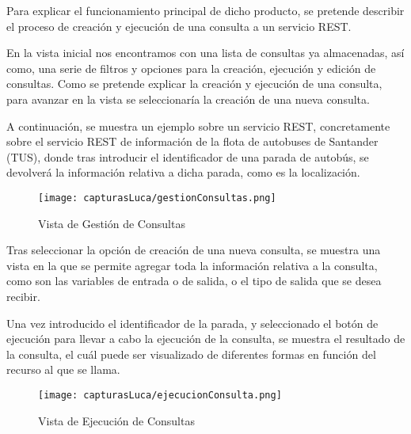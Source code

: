 \vspace{5mm}

Para explicar el funcionamiento principal de dicho producto, se pretende describir el proceso de creación y ejecución de una consulta a un servicio REST.

\vspace{5mm}

En la vista inicial nos encontramos con una lista de consultas ya almacenadas, así como, una serie de filtros y opciones para la creación, ejecución y edición de consultas. Como se pretende explicar la creación y ejecución de una consulta, para avanzar en la vista se seleccionaría la creación de una nueva consulta.


\vspace{5mm}

A continuación, se muestra un ejemplo sobre un servicio REST, concretamente sobre el servicio REST de información de la flota de autobuses de Santander (TUS), donde tras introducir el identificador de una parada de autobús, se devolverá la información relativa a dicha parada, como es la localización.


	
	\begin{figure}[H]
		\centering
 		\texttt{[image: capturasLuca/gestionConsultas.png]}
		\caption{Vista de Gestión de Consultas}\label{fig:gestionConsulta}
	\end{figure}

Tras seleccionar la opción de creación de una nueva consulta, se muestra una vista en la que se permite agregar toda la información relativa a la consulta, como son las variables de entrada o de salida, o el tipo de salida que se desea recibir.

\vspace{5mm}

Una vez introducido el identificador de la parada, y seleccionado el botón de ejecución para llevar a cabo la ejecución de la consulta, se muestra el resultado de la consulta, el cuál puede ser visualizado de diferentes formas en función del recurso al que se llama.


	\begin{figure}[H]
		\centering
		\texttt{[image: capturasLuca/ejecucionConsulta.png]}
		\caption{Vista de Ejecución de Consultas}\label{fig:ejecucionConsultas}
	\end{figure}


\vspace{5mm}



